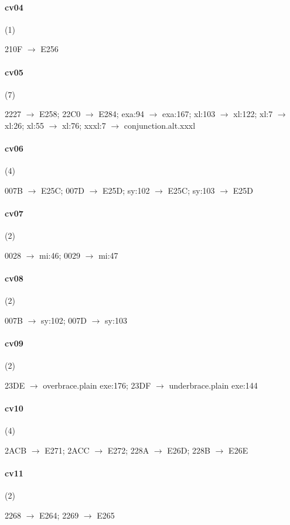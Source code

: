 \paragraph{cv04} (1)
\raggedright\small 210F $\to$ E256\par

\paragraph{cv05} (7)
\raggedright\small 2227 $\to$ E258; 22C0 $\to$ E284; exa:94 $\to$ exa:167;
xl:103 $\to$ xl:122; xl:7 $\to$ xl:26; xl:55 $\to$ xl:76; xxxl:7 $\to$
conjunction.alt.xxxl\par

\paragraph{cv06} (4)
\raggedright\small 007B $\to$ E25C; 007D $\to$ E25D; sy:102 $\to$ E25C; sy:103
$\to$ E25D\par

\paragraph{cv07} (2)
\raggedright\small 0028 $\to$ mi:46; 0029 $\to$ mi:47\par

\paragraph{cv08} (2)
\raggedright\small 007B $\to$ sy:102; 007D $\to$ sy:103\par

\paragraph{cv09} (2)
\raggedright\small 23DE $\to$ overbrace.plain \textbar{} exe:176; 23DF $\to$
underbrace.plain \textbar{} exe:144\par

\paragraph{cv10} (4)
\raggedright\small 2ACB $\to$ E271; 2ACC $\to$ E272; 228A $\to$ E26D; 228B
$\to$ E26E\par

\paragraph{cv11} (2)
\raggedright\small 2268 $\to$ E264; 2269 $\to$ E265\par

